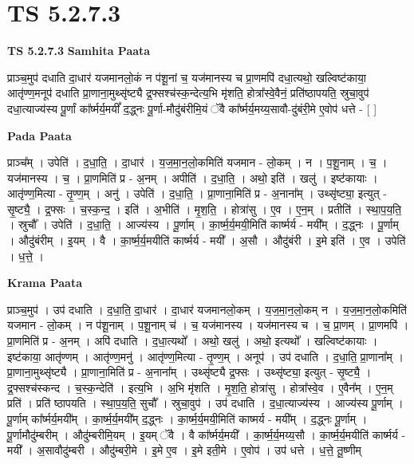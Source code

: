 \documentclass[17pt]{extarticle}
\begin{document}
\section{ TS 5.2.7.3 }

\textbf{TS 5.2.7.3 } \newline
\textbf{Samhita Paata} \newline

प्राञ्च॒मुप॑ दधाति दा॒धार॑ यजमानलो॒कं न प॑शू॒नां च॒ यज॑मानस्य च प्रा॒णमपि॑ दधा॒त्यथो॒ खल्विष्ट॑काया॒ आतृ॑ण्ण॒मनूप॑ दधाति प्रा॒णाना॒मुथ्सृ॑ष्ट्यै द्र॒फ्सश्च॑स्क॒न्देत्य॒भि मृ॑शति॒ होत्रा᳚स्वे॒वैनं॒ प्रति॑ष्ठापयति॒ स्रुचा॒वुप॑ दधा॒त्याज्य॑स्य पू॒र्णां का᳚र्ष्मर्य॒मयीं᳚ द॒द्ध्नः पू॒र्णा-मौदु॑बंरीमि॒यं ॅवै का᳚र्ष्मर्य॒मय्य॒सावौ-दु॑बंरी॒मे ए॒वोप॑ धत्ते - [  ] \newline

\textbf{Pada Paata} \newline

प्राञ्च᳚म् । उपेति॑ । द॒धा॒ति॒ । दा॒धार॑ । य॒ज॒मा॒न॒लो॒कमिति॑ यजमान - लो॒कम् । न । प॒शू॒नाम् । च॒ । यज॑मानस्य । च॒ । प्रा॒णमिति॑ प्र - अ॒नम् । अपीति॑ । द॒धा॒ति॒ । अथो॒ इति॑ । खलु॑ । इष्ट॑कायाः । आतृ॑ण्ण॒मित्या - तृ॒ण्ण॒म् । अनु॑ । उपेति॑ । द॒धा॒ति॒ । प्रा॒णाना॒मिति॑ प्र - अ॒नाना᳚म् । उथ्सृ॑ष्ट्या॒ इत्युत् - सृ॒ष्ट्यै॒ । द्र॒फ्सः । च॒स्क॒न्द॒ । इति॑ । अ॒भीति॑ । मृ॒श॒ति॒ । होत्रा॑सु । ए॒व । ए॒न॒म् । प्रतीति॑ । स्था॒प॒य॒ति॒ । स्रुचौ᳚ । उपेति॑ । द॒धा॒ति॒ । आज्य॑स्य । पू॒र्णाम् । का॒र्ष्म॒र्य॒मयी॒मिति॑ कार्ष्मर्य - मयी᳚म् । द॒द्ध्नः । पू॒र्णाम् । औदु॑बंरीम् । इ॒यम् । वै । का॒र्ष्म॒र्य॒मयीति॑ कार्ष्मर्य - मयी᳚ । अ॒सौ । औदु॑बंरी । इ॒मे इति॑ । ए॒व । उपेति॑ । ध॒त्ते॒ ।  \newline


\textbf{Krama Paata} \newline

प्राञ्च॒मुप॑ । उप॑ दधाति । द॒धा॒ति॒ दा॒धार॑ । दा॒धार॑ यजमानलो॒कम् । य॒ज॒मा॒न॒लो॒कम् न । य॒ज॒मा॒न॒लो॒कमिति॑ यजमान - लो॒कम् । न प॑शू॒नाम् । प॒शू॒नाम् च॑ । च॒ यज॑मानस्य । यज॑मानस्य च । च॒ प्रा॒णम् । प्रा॒णमपि॑ । प्रा॒णमिति॑ प्र - अ॒नम् । अपि॑ दधाति । द॒धा॒त्यथो᳚ । अथो॒ खलु॑ । अथो॒ इत्यथो᳚ । खल्विष्ट॑कायाः । इष्ट॑काया॒ आतृ॑ण्णम् । आतृ॑ण्ण॒मनु॑ । आतृ॑ण्ण॒मित्या - तृ॒ण्ण॒म् । अनूप॑ । उप॑ दधाति । द॒धा॒ति॒ प्रा॒णाना᳚म् । प्रा॒णाना॒मुथ्सृ॑ष्ट्यै । प्रा॒णाना॒मिति॑ प्र - अ॒नाना᳚म् । उथ्सृ॑ष्ट्यै द्र॒फ्सः । उथ्सृ॑ष्ट्या॒ इत्युत् - सृ॒ष्ट्यै॒ । द्र॒फ्सश्च॑स्कन्द । च॒स्क॒न्देति॑ । इत्य॒भि । अ॒भि मृ॑शति । मृ॒श॒ति॒ होत्रा॑सु । होत्रा᳚स्वे॒व । ए॒वैन᳚म् । ए॒न॒म् प्रति॑ । प्रति॑ ष्ठापयति । स्था॒प॒य॒ति॒ सुचौ᳚ । स्रुचा॒वुप॑ । उप॑ दधाति । द॒धा॒त्याज्य॑स्य । आज्य॑स्य पू॒र्णाम् । पू॒र्णाम् का᳚र्ष्मर्य॒मयी᳚म् । का॒र्ष्म॒र्य॒मयी᳚म् द॒द्ध्नः । का॒र्ष्म॒र्य॒मयी॒मिति॑ काष्मर्य - मयी᳚म् । द॒द्ध्नः पू॒र्णाम् । पू॒र्णामौदु॑म्बरीम् । औदु॑म्बरीमि॒यम् । इ॒यम् ॅवै । वै का᳚र्ष्मर्य॒मयी᳚ । का॒र्ष्म॒र्य॒मय्य॒सौ । का॒र्ष्म॒र्य॒मयीति॑ कार्ष्मर्य - मयी᳚ । अ॒सावौदु॑म्बरी । औदु॑म्बरी॒मे । इ॒मे ए॒व । इ॒मे इती॒मे । ए॒वोप॑ । उप॑ धत्ते । ध॒त्ते॒ तू॒ष्णीम् \newline
\end{document}
